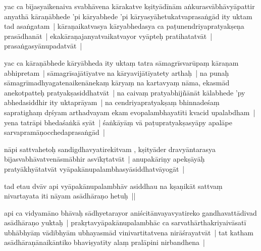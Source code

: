 \documentclass[article,12pt,a4paper]{memoir}%
\newcounter{parCount}
\begin{document}
	  
	  \pstart \leavevmode%
	\label{thakur75-81.22}yac ca bījasyaikenaiva svabhāvena kārakatve kṣityādīnām aṅkurasvābhāvyāpattir anyathā kāraṇābhede 'pi kāryabhede 'pi kāryasyāhetukatvaprasaṅgād ity uktam tad asaṅgatam | kāraṇaikatvasya kāryabhedasya ca paṭunendriyapratyakṣeṇa prasādhanāt | ekakāraṇajanyatvaikatvayor vyāpteḥ pratihatatvāt | prasaṅgasyānupadatvāt |
	{}
	\pend%
      

	  
	  \pstart \leavevmode%
	\label{thakur75-81.26}yac ca kāraṇābhede kāryābheda ity uktaṃ tatra sāmagrīsvarūpaṃ kāraṇam abhipretam | sāmagrīsajātīyatve na kāryavijātīyatety arthaḥ | na punaḥ sāmagrīmadhyagatenaikenānekaṃ kāryaṃ na kartavyaṃ nāma, ekasmād anekotpatteḥ pratyakṣasiddhatvāt | na caivaṃ pratyabhijñānāt kālabhede 'py abhedasiddhir ity uktaprāyam | na cendriyapratyakṣaṃ bhinnadeśaṃ sapratighaṃ dṛśyam arthadvayam ekam evopalambhayatīti kvacid upalabdham | yena tatrāpi bhedaśaṅkā syāt | śaṅkāyāṃ vā paṭupratyakṣasyāpy apalāpe sarvapramāṇocchedaprasaṅgād |
	{}
	\pend%
      

	  
	  \pstart \leavevmode%
	\label{thakur75-82.3}nāpi sattvahetoḥ sandigdhavyatirekitvam , kṣityāder dravyāntarasya bījasvabhāvatvenāsmābhir asvīkṛtatvāt | anupakāriṇy apekṣāyāḥ pratyākhyātatvāt vyāpakānupalambhasyāsiddhatvāyogāt |
	{}
	\pend%
      

	  
	  \pstart \leavevmode%
	\label{thakur75-82.6}tad etau dvāv api vyāpakānupalambhāv asiddhau na kṣaṇikāt sattvaṃ nivartayata iti nāyam asādhāraṇo hetuḥ ||
	{}
	\pend%
      

	  
	  \pstart \leavevmode%
	\label{thakur75-82.8}api ca vidyamāno bhāvaḥ sādhyetarayor aniścitānvayavyatireko gandhavattādivad asādhāraṇo yuktaḥ | prakṛtavyāpakānupalambhāc ca sarvathārthakriyaivāsatī ubhābhyāṃ vādibhyām ubhayasmād vinivartitatvena nirāśrayatvāt | tat katham asādhāraṇānaikāntiko bhaviṣyatīty alaṃ pralāpini nirbandhena |
	{}
	\pend%
      
\end{document}

